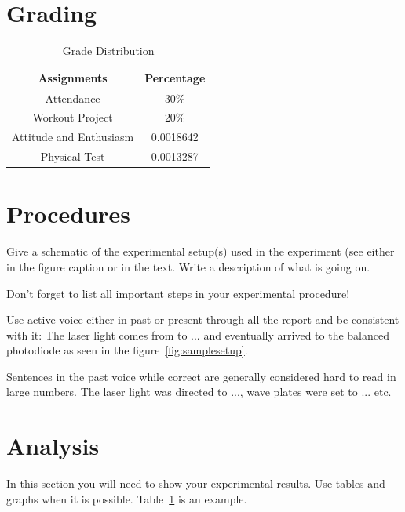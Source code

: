 \documentclass[letterpaper,12pt]{article}
\begin{document}
\section{Grading}
\begin{table}[ht]
\begin{center}
\caption{Grade Distribution}
\label{tbl:bins} %
\begin{tabular}{|cc|}
\hline
\multicolumn{1}{|c}{Assignments} & \multicolumn{1}{c|}{Percentage} \\
\hline
Attendance &   30\% \\
Workout Project &   20\% \\
Attitude and Enthusiasm &   0.0018642 \\
Physical Test &   0.0013287 \\
\hline
\end{tabular}
\end{center}
\end{table}





\section{Procedures}

Give a schematic of the experimental setup(s) used in the experiment (see
either in the figure caption or in the text. Write a description of what is
going on.

Don't forget to list all important steps in your experimental procedure!

Use active voice either in past or present through all the report and be
consistent with it:
The laser light comes  from to ... and eventually arrived to the
balanced photodiode as seen in the figure~\ref{fig:samplesetup}.

Sentences in the past voice while correct are generally considered hard to read
in large numbers. The laser light was directed to ..., wave plates were set
to ... etc.


\section{Analysis}

In this section you will need to show your experimental results. Use tables and
graphs when it is possible. Table~\ref{tbl:bins} is an example.
\end{document}
